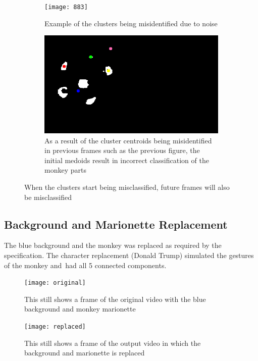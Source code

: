 \documentclass[12pt,a4paper]{article}
\begin{document}
      \begin{figure}[H]
        \centering
        \begin{subfigure}[H]{0.49\textwidth}
          \texttt{[image: 883]}
          \caption{Example of the clusters being misidentified due to noise}
        \end{subfigure}
        \begin{subfigure}[H]{0.49\textwidth}
          \includegraphics[width=\linewidth]{952}
          \caption{As a result of the cluster centroids being misidentified in previous frames such as the previous figure, the initial medoids result in incorrect classification of the monkey parts}
        \end{subfigure}
      \caption{When the clusters start being misclassified, future frames will also be misclassified}
      \end{figure}

      \subsection{Background and Marionette Replacement}

      The blue background and the monkey was replaced as required by the specification. The character replacement (Donald Trump) simulated the gestures of the monkey and\
      had all 5 connected components.

      \begin{figure}[H]
        \texttt{[image: original]}
        \caption{This still shows a frame of the original video with the blue background and monkey marionette}
      \end{figure}
      \begin{figure}[H]
        \texttt{[image: replaced]}
        \caption{This still shows a frame of the output video in which the background and marionette is replaced}
      \end{figure}
\end{document}
